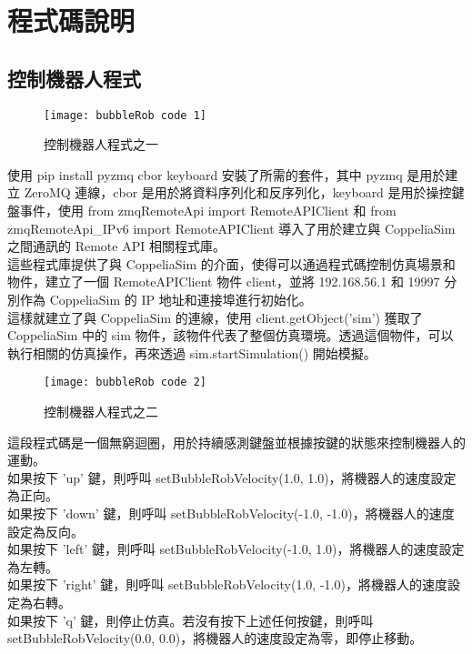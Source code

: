 \chapter{程式碼說明}
\renewcommand{\baselinestretch}{10.0} %
\setcounter{page}{5}  %
\fontsize{14pt}{2.5pt}\sectionef

\section{控制機器人程式}
\begin{figure}[hbt!]
\begin{center}
\texttt{[image: bubbleRob code 1]}
\caption{\Large 控制機器人程式之一}\label{控制機器人程式之一}
\end{center}
\end{figure} 
使用 pip install pyzmq cbor keyboard 安裝了所需的套件，其中 pyzmq 是用於建立 ZeroMQ 連線，cbor 是用於將資料序列化和反序列化，keyboard 是用於操控鍵盤事件，使用 from zmqRemoteApi import RemoteAPIClient 和 from zmqRemoteApi_IPv6 import RemoteAPIClient 導入了用於建立與 CoppeliaSim 之間通訊的 Remote API 相關程式庫。\\
這些程式庫提供了與 CoppeliaSim 的介面，使得可以通過程式碼控制仿真場景和物件，建立了一個 RemoteAPIClient 物件 client，並將 192.168.56.1 和 19997 分別作為 CoppeliaSim 的 IP 地址和連接埠進行初始化。\\
這樣就建立了與 CoppeliaSim 的連線，使用 client.getObject('sim') 獲取了 CoppeliaSim 中的 sim 物件，該物件代表了整個仿真環境。透過這個物件，可以執行相關的仿真操作，再來透過  sim.startSimulation() 開始模擬。\\
\begin{figure}[hbt!]
\begin{center}
\texttt{[image: bubbleRob code 2]}
\caption{\Large 控制機器人程式之二}\label{控制機器人程式之二}
\end{center}
\end{figure} 
這段程式碼是一個無窮迴圈，用於持續感測鍵盤並根據按鍵的狀態來控制機器人的運動。\\
如果按下 'up' 鍵，則呼叫 setBubbleRobVelocity(1.0, 1.0)，將機器人的速度設定為正向。\\
如果按下 'down' 鍵，則呼叫 setBubbleRobVelocity(-1.0, -1.0)，將機器人的速度設定為反向。\\
如果按下 'left' 鍵，則呼叫 setBubbleRobVelocity(-1.0, 1.0)，將機器人的速度設定為左轉。\\
如果按下 'right' 鍵，則呼叫 setBubbleRobVelocity(1.0, -1.0)，將機器人的速度設定為右轉。\\
如果按下 'q' 鍵，則停止仿真。若沒有按下上述任何按鍵，則呼叫 setBubbleRobVelocity(0.0, 0.0)，將機器人的速度設定為零，即停止移動。\\
\renewcommand{\baselinestretch}{0.5} %
